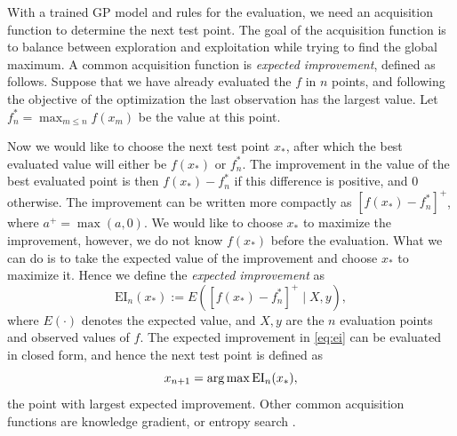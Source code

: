 
With a trained GP model and rules for the evaluation, we need an acquisition function to determine the next test point. The goal of the acquisition function is to balance between exploration and exploitation while trying to find the global maximum. A common acquisition function is \textit{expected improvement}, defined as follows. Suppose that we have already evaluated the $f$ in $n$ points, and following the objective of the optimization the last observation has the largest value. Let $f_n^* = \max_{m\leq n}f(x_m)$ be the value at this point. 

Now we would like to choose the next test point $x_*$, after which the best evaluated value will either be $f(x_*)$ or $f_n^*$. The improvement in the value of the best evaluated point is then $f(x_*)-f_n^*$ if this difference is positive, and 0 otherwise. The improvement can be written more compactly as $[f(x_*)-f_n^*]^+$, where $a^+=\max(a,0)$. We would like to choose $x_*$ to maximize the improvement, however, we do not know $f(x_*)$ before the evaluation. What we can do is to take the expected value of the improvement and choose $x_*$ to maximize it. Hence we define the \textit{expected improvement} as
\begin{equation}\label{eq:ei}
    \mathrm{EI}_n(x_*):=E\left([f(x_*)-f_n^*]^+ \mid X,y\right),
\end{equation}
where $E(\cdot)$ denotes the expected value, and $X,y$ are the $n$ evaluation points and observed values of $f$. The expected improvement in \eqref{eq:ei} can be evaluated in closed form, and hence the next test point is defined as
\begin{equation}
    x_{n+1} = \operatorname*{arg\,max}\mathrm{EI}_n(x_*),
\end{equation}
the point with largest expected improvement. Other common acquisition functions are knowledge gradient, or entropy search \cite{frazier2018tutorial}.


